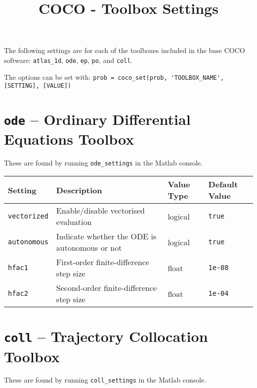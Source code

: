 \documentclass[11pt]{article}
\title{COCO - Toolbox Settings}
\author{}
\date{}
\begin{document}
\maketitle

The following settings are for each of the toolboxes included in the base COCO software: \verb!atlas_1d!, \verb!ode!, \verb!ep!, \verb!po!, and \verb!coll!. 

The options can be set with: \verb!prob = coco_set(prob, 'TOOLBOX_NAME', [SETTING], [VALUE])!

\section*{\texttt{ode} -- Ordinary Differential Equations Toolbox}

These are found by running \verb!ode_settings! in the Matlab console.

\begin{table}[h]
  \centering
  \begin{tabular}{l|l|l|l}
    \textbf{Setting}  & \textbf{Description}                             & \textbf{Value Type} & \textbf{Default Value} \\[1ex] \hline
    \verb!vectorized! & Enable/disable vectorised evaluation             & logical             & \verb!true!            \\[1ex]
    \verb!autonomous! & Indicate whether the ODE is autonomous or not    & logical             & \verb!true!            \\[1ex]
    \verb!hfac1!      & First-order finite-difference step size          & float               & \verb!1e-08!           \\[1ex]
    \verb!hfac2!      & Second-order finite-difference step size         & float               & \verb!1e-04!         
  \end{tabular}
\end{table}

\clearpage
\section*{\texttt{coll} -- Trajectory Collocation Toolbox}

These are found by running \verb!coll_settings! in the Matlab console.
\end{document}

